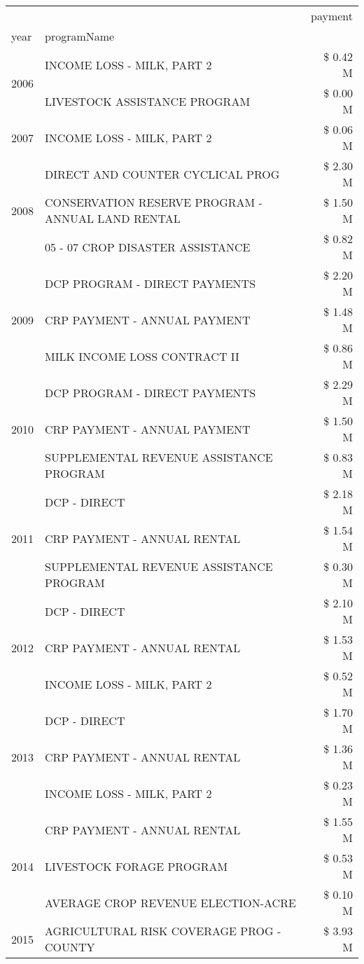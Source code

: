 \begin{tabular}{llr}
\toprule
 &  & payment \\
year & programName &  \\
\midrule
\multirow[t]{2}{*}{2006} & INCOME LOSS - MILK, PART 2 & \$ 0.42 M \\
 & LIVESTOCK ASSISTANCE PROGRAM & \$ 0.00 M \\
\cline{1-3}
2007 & INCOME LOSS - MILK, PART 2 & \$ 0.06 M \\
\cline{1-3}
\multirow[t]{3}{*}{2008} & DIRECT AND COUNTER CYCLICAL PROG & \$ 2.30 M \\
 & CONSERVATION RESERVE PROGRAM - ANNUAL LAND RENTAL & \$ 1.50 M \\
 & 05 - 07 CROP DISASTER ASSISTANCE & \$ 0.82 M \\
\cline{1-3}
\multirow[t]{3}{*}{2009} & DCP PROGRAM - DIRECT PAYMENTS & \$ 2.20 M \\
 & CRP PAYMENT - ANNUAL PAYMENT & \$ 1.48 M \\
 & MILK INCOME LOSS CONTRACT II & \$ 0.86 M \\
\cline{1-3}
\multirow[t]{3}{*}{2010} & DCP PROGRAM - DIRECT PAYMENTS & \$ 2.29 M \\
 & CRP PAYMENT - ANNUAL PAYMENT & \$ 1.50 M \\
 & SUPPLEMENTAL REVENUE ASSISTANCE PROGRAM & \$ 0.83 M \\
\cline{1-3}
\multirow[t]{3}{*}{2011} & DCP - DIRECT & \$ 2.18 M \\
 & CRP PAYMENT - ANNUAL RENTAL & \$ 1.54 M \\
 & SUPPLEMENTAL REVENUE ASSISTANCE PROGRAM & \$ 0.30 M \\
\cline{1-3}
\multirow[t]{3}{*}{2012} & DCP - DIRECT & \$ 2.10 M \\
 & CRP PAYMENT - ANNUAL RENTAL & \$ 1.53 M \\
 & INCOME LOSS - MILK, PART 2 & \$ 0.52 M \\
\cline{1-3}
\multirow[t]{3}{*}{2013} & DCP - DIRECT & \$ 1.70 M \\
 & CRP PAYMENT - ANNUAL RENTAL & \$ 1.36 M \\
 & INCOME LOSS - MILK, PART 2 & \$ 0.23 M \\
\cline{1-3}
\multirow[t]{3}{*}{2014} & CRP PAYMENT - ANNUAL RENTAL & \$ 1.55 M \\
 & LIVESTOCK FORAGE PROGRAM & \$ 0.53 M \\
 & AVERAGE CROP REVENUE ELECTION-ACRE & \$ 0.10 M \\
\cline{1-3}
\multirow[t]{3}{*}{2015} & AGRICULTURAL RISK COVERAGE PROG - COUNTY & \$ 3.93 M \\

\end{tabular}
